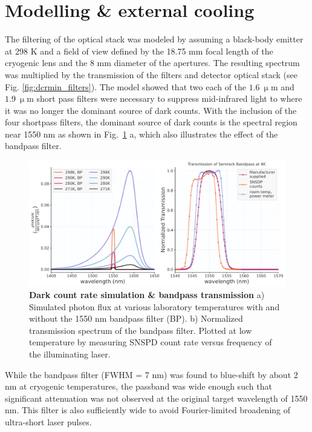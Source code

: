 \documentclass[11pt]{caltech_thesis} %
\begin{document}
\hypertarget{modelling-external-cooling}{%
\section{Modelling \& external cooling}\label{modelling-external-cooling}}

The filtering of the optical stack was modeled by assuming a black-body emitter at 298 K and a field of view defined by the 18.75 mm focal length of the cryogenic lens and the 8 mm diameter of the apertures. The resulting spectrum was multiplied by the transmission of the filters and detector optical stack (see Fig. \ref{fig:dcrmin_filters}). The model showed that two each of the $1.6 \ \mathrm{\upmu m}$ and $1.9 \ \mathrm{\upmu m}$ short pass filters were necessary to suppress mid-infrared light to where it was no longer the dominant source of dark counts. With the inclusion of the four shortpass filters, the dominant source of dark counts is the spectral region near 1550 nm as shown in Fig.~\ref{fig:simulation_filter} a, which also illustrates the effect of the bandpass filter.

\hypertarget{fig:simulation_filter}{%
\begin{figure}
\centering
\includegraphics[width=1\textwidth,height=\textheight]{./chapter_02/figs/simulation_filter_thesis_light.pdf}
\caption[{Dark count rate simulation \& bandpass transmission}]{\textbf{Dark count rate simulation \& bandpass transmission} a) Simulated photon flux at various laboratory temperatures with and without the 1550 nm bandpass filter (BP). b) Normalized transmission spectrum of the bandpass filter. Plotted at low temperature by measuring SNSPD count rate versus frequency of the illuminating laser.}
\label{fig:simulation_filter}
\end{figure}
}

While the bandpass filter (FWHM = 7 nm) was found to blue-shift by about 2 nm at cryogenic temperatures, the passband was wide enough such that significant attenuation was not observed at the original target wavelength of 1550 nm. This filter is also sufficiently wide to avoid Fourier-limited broadening of ultra-short laser pulses.
\end{document}
